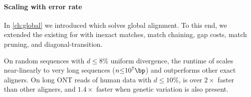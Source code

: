 \paragraph{Scaling with error rate}

In \cref{ch:global} we introduced \astarpa which solves global alignment. To
this end, we extended the existing \sh for \A with inexact matches, match
chaining, gap costs, match pruning, and diagonal-transition.

On random sequences with $d{\leq}8\%$ uniform divergence, the runtime of
\astarpa scales near-linearly to very long sequences ($n{\leq}10^7\bp$) and
outperforms other exact aligners. On long ONT reads of human data with $d{\leq}10\%$,
\astarpa is over $2\times$ faster than other aligners, and $1.4\times$ faster
when genetic variation is also present.